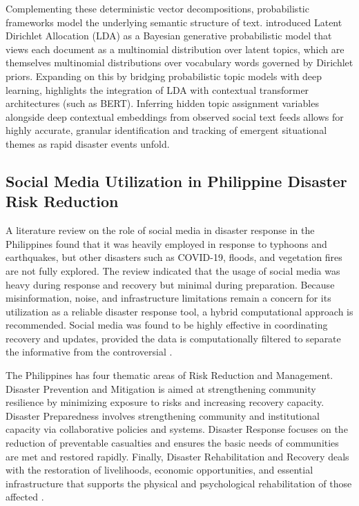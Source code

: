 \documentclass[12pt,a4paper]{report}
\begin{document}
Complementing these deterministic vector decompositions, probabilistic
frameworks model the underlying semantic structure of text.
\parencite{blei2003} introduced Latent Dirichlet Allocation (LDA) as a Bayesian
generative probabilistic model that views each document as a multinomial
distribution over latent topics, which are themselves multinomial
distributions over vocabulary words governed by Dirichlet priors. Expanding on
this by bridging probabilistic topic models with deep learning,
\parencite{zang2026} highlights the integration of LDA with contextual transformer
architectures (such as BERT). Inferring hidden topic assignment variables
alongside deep contextual embeddings from observed social text feeds allows for
highly accurate, granular identification and tracking of emergent situational
themes as rapid disaster events unfold.

\subsection{Social Media Utilization in Philippine Disaster Risk Reduction}

A literature review on the role of social media in disaster response in the
Philippines found that it was heavily employed in response to typhoons and
earthquakes, but other disasters such as COVID-19, floods, and vegetation
fires are not fully explored. The review indicated that the usage of social
media was heavy during response and recovery but minimal during preparation.
Because misinformation, noise, and infrastructure limitations remain a concern
for its utilization as a reliable disaster response tool, a hybrid
computational approach is recommended. Social media was found to be highly
effective in coordinating recovery and updates, provided the data is
computationally filtered to separate the informative from the controversial
\parencite{inferio2025}.

The Philippines has four thematic areas of Risk Reduction and Management.
Disaster Prevention and Mitigation is aimed at strengthening community
resilience by minimizing exposure to risks and increasing recovery capacity.
Disaster Preparedness involves strengthening community and institutional
capacity via collaborative policies and systems. Disaster Response focuses on
the reduction of preventable casualties and ensures the basic needs of
communities are met and restored rapidly. Finally, Disaster Rehabilitation and
Recovery deals with the restoration of livelihoods, economic opportunities, and
essential infrastructure that supports the physical and psychological
rehabilitation of those affected \parencite{inferio2025}.
\end{document}
